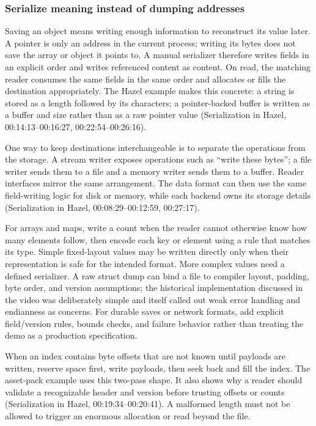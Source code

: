 \subsubsection{Serialize meaning instead of dumping addresses}\label{06-engine-ii-ch032-serialize-meaning-instead-of-dumping-addresses}

\hypertarget{06-engine-ii-ch032-serialize-meaning-instead-of-dumping-addresses}{}

Saving an object means writing enough information to reconstruct its value later. A pointer is only an address in the current process; writing its bytes does not save the array or object it points to. A manual serializer therefore writes fields in an explicit order and writes referenced content as content. On read, the matching reader consumes the same fields in the same order and allocates or fills the destination appropriately. The Hazel example makes this concrete: a string is stored as a length followed by its characters; a pointer-backed buffer is written as a buffer and size rather than as a raw pointer value (Serialization in Hazel, 00:14:13--00:16:27, 00:22:54--00:26:16).

One way to keep destinations interchangeable is to separate the operations from the storage. A stream writer exposes operations such as ``write these bytes''; a file writer sends them to a file and a memory writer sends them to a buffer. Reader interfaces mirror the same arrangement. The data format can then use the same field-writing logic for disk or memory, while each backend owns its storage details (Serialization in Hazel, 00:08:29--00:12:59, 00:27:17).

For arrays and maps, write a count when the reader cannot otherwise know how many elements follow, then encode each key or element using a rule that matches its type. Simple fixed-layout values may be written directly only when their representation is safe for the intended format. More complex values need a defined serializer. A raw struct dump can bind a file to compiler layout, padding, byte order, and version assumptions; the historical implementation discussed in the video was deliberately simple and itself called out weak error handling and endianness as concerns. For durable saves or network formats, add explicit field/version rules, bounds checks, and failure behavior rather than treating the demo as a production specification.

When an index contains byte offsets that are not known until payloads are written, reserve space first, write payloads, then seek back and fill the index. The asset-pack example uses this two-pass shape. It also shows why a reader should validate a recognizable header and version before trusting offsets or counts (Serialization in Hazel, 00:19:34--00:20:41). A malformed length must not be allowed to trigger an enormous allocation or read beyond the file.

